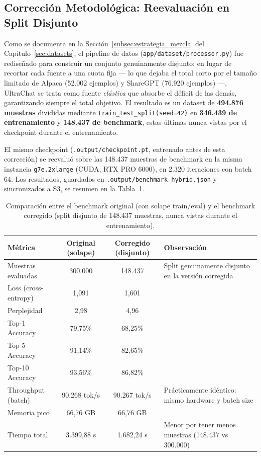 \subsection{Corrección Metodológica: Reevaluación en Split Disjunto}
\label{subsec:benchmark_corregido}

Como se documenta en la Sección~\ref{subsec:estrategia_mezcla} del Capítulo~\ref{sec:datasets}, el pipeline de datos (\texttt{app/dataset/processor.py}) fue rediseñado para construir un conjunto genuinamente disjunto: en lugar de recortar cada fuente a una cuota fija --- lo que dejaba el total corto por el tamaño limitado de Alpaca (52.002 ejemplos) y ShareGPT (76.920 ejemplos) ---, UltraChat se trata como fuente \textit{elástica} que absorbe el déficit de las demás, garantizando siempre el total objetivo. El resultado es un dataset de \textbf{494.876 muestras} divididas mediante \texttt{train\_test\_split(seed=42)} en \textbf{346.439 de entrenamiento} y \textbf{148.437 de benchmark}, estas últimas nunca vistas por el checkpoint durante el entrenamiento.

El mismo checkpoint (\texttt{.output/checkpoint.pt}, entrenado antes de esta corrección) se reevaluó sobre las 148.437 muestras de benchmark en la misma instancia \texttt{g7e.2xlarge} (CUDA, RTX PRO 6000), en 2.320 iteraciones con batch 64. Los resultados, guardados en \texttt{.output/benchmark\_hybrid.json} y sincronizados a S3, se resumen en la Tabla~\ref{tab:benchmark_corregido}.

\begin{table}[H]
\centering
\begin{tabularx}{\textwidth}{|l|c|c|X|}
\hline
\textbf{Métrica} & \textbf{Original (solape)} & \textbf{Corregido (disjunto)} & \textbf{Observación} \\ \hline
Muestras evaluadas & 300.000 & 148.437 & Split genuinamente disjunto en la versión corregida \\ \hline
Loss (cross-entropy) & 1,091 & 1,601 & \\ \hline
Perplejidad & 2,98 & 4,96 & \\ \hline
Top-1 Accuracy & 79,75\% & 68,25\% & \\ \hline
Top-5 Accuracy & 91,14\% & 82,65\% & \\ \hline
Top-10 Accuracy & 93,56\% & 86,82\% & \\ \hline
Throughput (batch) & 90.268 tok/s & 90.267 tok/s & Prácticamente idéntico: mismo hardware y batch size \\ \hline
Memoria pico & 66,76 GB & 66,76 GB & \\ \hline
Tiempo total & 3.399,88 s & 1.682,24 s & Menor por tener menos muestras (148.437 vs 300.000) \\ \hline
\end{tabularx}
\caption{Comparación entre el benchmark original (con solape train/eval) y el benchmark corregido (split disjunto de 148.437 muestras, nunca vistas durante el entrenamiento).}
\label{tab:benchmark_corregido}
\end{table}


